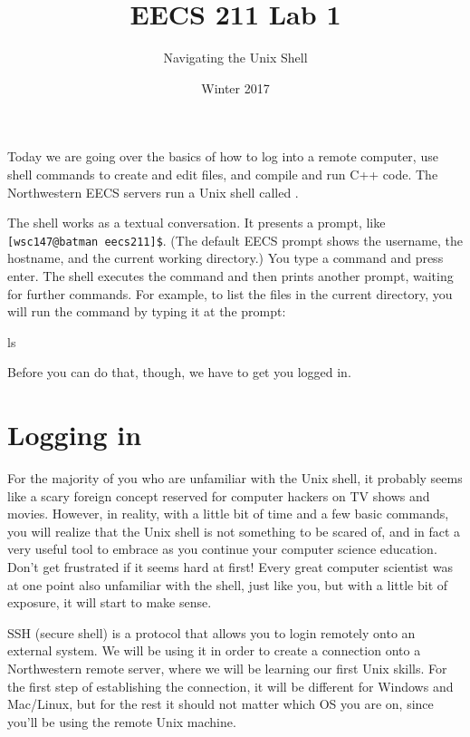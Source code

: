 \documentclass{tufte-handout}
\title{EECS 211 Lab 1}
\author{Navigating the Unix Shell}
\date{Winter 2017}
\begin{document}
\maketitle

Today we are going over the basics of how to log into a remote computer,
use shell commands to create and edit files, and compile and run C++
code. The Northwestern EECS servers run a Unix shell called
.

The shell works as a textual conversation. It presents a prompt, like
\verb![wsc147@batman eecs211]$!. (The default EECS prompt shows the
username, the hostname, and the current working directory.) You type a
command and press enter. The shell executes the command and then prints
another prompt, waiting for further commands. For example, to list the
files in the current directory, you will run the  command
by typing it at the prompt:

\begin{CmdLine}
  \prompt ls
\end{CmdLine}


\noindent
Before you can do that, though, we have to get you logged in.

\section{Logging in}

For the majority of you who are unfamiliar with the Unix shell, it
probably seems like a scary foreign concept reserved for computer
hackers on TV shows and movies.  However, in reality, with a little bit
of time and a few basic commands, you will realize that the Unix shell
is not something to be scared of, and in fact a very useful tool to
embrace as you continue your computer science education. Don't get
frustrated if it seems hard at first! Every great computer scientist was
at one point also unfamiliar with the shell, just like you, but with a
little bit of exposure, it will start to make sense.

SSH (secure shell) is a protocol that allows you to login remotely onto
an external system. We will be using it in order to create a connection
onto a Northwestern remote server, where we will be learning our first
Unix skills. For the first step of establishing the connection, it will
be different for Windows and Mac/Linux, but for the rest it should not
matter which OS you are on, since you'll be using the remote Unix
machine.
\end{document}
